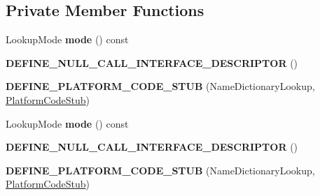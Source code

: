 \subsection*{Private Member Functions}
\begin{DoxyCompactItemize}
\item 
Lookup\+Mode {\bfseries mode} () const \hypertarget{classv8_1_1internal_1_1_name_dictionary_lookup_stub_ae1880a8b261f163f4d11a3d3809252ab}{}\label{classv8_1_1internal_1_1_name_dictionary_lookup_stub_ae1880a8b261f163f4d11a3d3809252ab}

\item 
{\bfseries D\+E\+F\+I\+N\+E\+\_\+\+N\+U\+L\+L\+\_\+\+C\+A\+L\+L\+\_\+\+I\+N\+T\+E\+R\+F\+A\+C\+E\+\_\+\+D\+E\+S\+C\+R\+I\+P\+T\+OR} ()\hypertarget{classv8_1_1internal_1_1_name_dictionary_lookup_stub_a56e72757ba3ab8928220e89075ca6848}{}\label{classv8_1_1internal_1_1_name_dictionary_lookup_stub_a56e72757ba3ab8928220e89075ca6848}

\item 
{\bfseries D\+E\+F\+I\+N\+E\+\_\+\+P\+L\+A\+T\+F\+O\+R\+M\+\_\+\+C\+O\+D\+E\+\_\+\+S\+T\+UB} (Name\+Dictionary\+Lookup, \hyperlink{classv8_1_1internal_1_1_platform_code_stub}{Platform\+Code\+Stub})\hypertarget{classv8_1_1internal_1_1_name_dictionary_lookup_stub_a9b6511fda10d2ab14ce9366da895bb71}{}\label{classv8_1_1internal_1_1_name_dictionary_lookup_stub_a9b6511fda10d2ab14ce9366da895bb71}

\item 
Lookup\+Mode {\bfseries mode} () const \hypertarget{classv8_1_1internal_1_1_name_dictionary_lookup_stub_ae1880a8b261f163f4d11a3d3809252ab}{}\label{classv8_1_1internal_1_1_name_dictionary_lookup_stub_ae1880a8b261f163f4d11a3d3809252ab}

\item 
{\bfseries D\+E\+F\+I\+N\+E\+\_\+\+N\+U\+L\+L\+\_\+\+C\+A\+L\+L\+\_\+\+I\+N\+T\+E\+R\+F\+A\+C\+E\+\_\+\+D\+E\+S\+C\+R\+I\+P\+T\+OR} ()\hypertarget{classv8_1_1internal_1_1_name_dictionary_lookup_stub_a56e72757ba3ab8928220e89075ca6848}{}\label{classv8_1_1internal_1_1_name_dictionary_lookup_stub_a56e72757ba3ab8928220e89075ca6848}

\item 
{\bfseries D\+E\+F\+I\+N\+E\+\_\+\+P\+L\+A\+T\+F\+O\+R\+M\+\_\+\+C\+O\+D\+E\+\_\+\+S\+T\+UB} (Name\+Dictionary\+Lookup, \hyperlink{classv8_1_1internal_1_1_platform_code_stub}{Platform\+Code\+Stub})\hypertarget{classv8_1_1internal_1_1_name_dictionary_lookup_stub_a9b6511fda10d2ab14ce9366da895bb71}{}\label{classv8_1_1internal_1_1_name_dictionary_lookup_stub_a9b6511fda10d2ab14ce9366da895bb71}


\end{DoxyCompactItemize}

